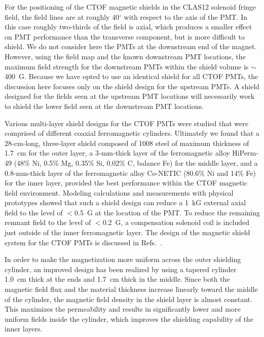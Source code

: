 \documentclass[3p,times,twocolumn]{elsarticle}
\begin{document}
For the positioning of the CTOF magnetic shields in the CLAS12 solenoid fringe field, the field lines are at
roughly 40$^\circ$ with respect to the axis of the PMT. In this case roughly two-thirds of the field is axial,
which produces a smaller effect on PMT performance than the transverse component, but is more difficult
to shield. We do not consider here the PMTs at the downstream end of the magnet. However, using the field
map and the known downstream PMT locations, the maximum field strength for the downstream PMTs within
the shield volume is $\sim$400~G. Because we have opted to use an identical shield for all CTOF PMTs, the
discussion here focuses only on the shield design for the upstream PMTs. A shield designed for the fields
seen at the upstream PMT locations will necessarily work to shield the lower field seen at the downstream
PMT locations.

Various multi-layer shield designs for the CTOF PMTs were studied that were comprised of different
coaxial ferromagnetic cylinders. Ultimately we found that a 28-cm-long, three-layer shield composed of 1008
steel of maximum thickness of 1.7~cm for the outer layer, a 3-mm-thick layer of the ferromagnetic alloy
HiPerm-49 (48\% Ni, 0.5\% Mg, 0.35\% Si, 0.02\% C, balance Fe) for the middle layer, and a 0.8-mm-thick
layer of the ferromagnetic alloy Co-NETIC (80.6\% Ni and 14\% Fe) for the inner layer, provided the best
performance within the CTOF magnetic field environment. Modeling calculations and measurements with
physical prototypes showed that such a shield design can reduce a 1~kG external axial field to the level of 
$<$0.5~G at the location of the PMT. To reduce the remaining remnant field to the level of $<$0.2~G, a
compensation solenoid coil is included just outside of the inner ferromagnetic layer. The design of the magnetic
shield system for the CTOF PMTs is discussed in Refs.~\cite{baturin12,cn2015-003}.

In order to make the magnetization more uniform across the outer shielding cylinder, an improved design has
been realized by using a tapered cylinder 1.0~cm thick at the ends and 1.7~cm thick in the middle.  Since both
the magnetic field flux and the material thickness increase linearly toward the middle of the cylinder, the
magnetic field density in the shield layer is almost constant. This maximizes the permeability and results in
significantly lower and more uniform fields inside the cylinder, which improves the shielding capability of the 
inner layers.
\end{document}
